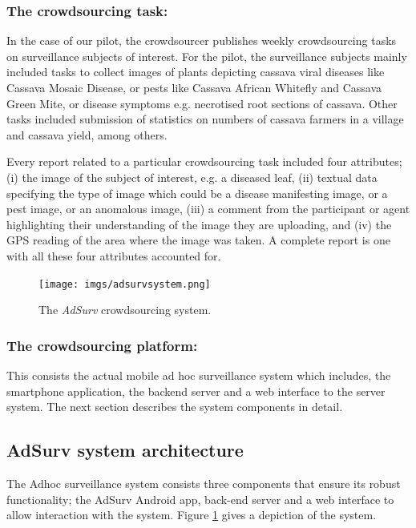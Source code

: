 \documentclass[letterpaper]{article} %
\begin{document}
\subsubsection{The crowdsourcing task:}
In the case of our pilot, the crowdsourcer publishes weekly crowdsourcing tasks on surveillance subjects of interest. For the pilot, the surveillance subjects mainly included tasks to collect images of plants depicting cassava viral diseases like Cassava Mosaic Disease, or pests like Cassava African Whitefly and Cassava Green Mite, or disease symptoms e.g. necrotised root sections of cassava. Other tasks included submission of statistics on numbers of cassava farmers in a village and cassava yield, among others.

Every report related to a particular crowdsourcing task included four attributes; (i) the image of the subject of interest, e.g. a diseased leaf, (ii) textual data specifying the type of image which could be a disease manifesting image, or a pest image, or an anomalous image, (iii) a comment from the participant or agent highlighting their understanding of the image they are uploading, and (iv) the GPS reading of the area where the image was taken. A complete report is one with all these four attributes accounted for.


\begin{figure}
\centering
\texttt{[image: imgs/adsurvsystem.png]}
\caption{The \emph{AdSurv} crowdsourcing system.}
\label{adsurvsystem}
\end{figure}






\subsubsection{The crowdsourcing platform:}
This consists the actual mobile ad hoc surveillance system which includes, the smartphone application, the backend server and a web interface to the server system. The next section describes the system components in detail.

\subsection{AdSurv system architecture}
The Adhoc surveillance system consists three components that ensure its robust functionality; the AdSurv Android app, back-end server and a web interface to allow interaction with the system. Figure \ref{adsurvsystem} gives a depiction of the system.
\end{document}
